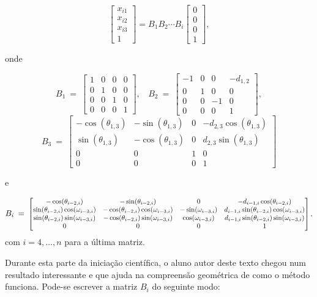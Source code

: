 \documentclass[
	12pt,				%
	openright,			%
	twoside,			%
	a4paper,			%
	english,			%
	french,				%
	spanish,			%
	brazil				%
	]{abntex2}
\newcommand\scalemath[2]{\scalebox{#1}{\mbox{\ensuremath{\displaystyle #2}}}}
\begin{document}
$$
\begin{bmatrix}
x_{i1}\\ 
x_{i2}\\ 
x_{i3}\\ 
1
\end{bmatrix}
= B_{1}B_{2}\cdots B_{i}\begin{bmatrix}
0\\ 
0\\ 
0\\ 
1
\end{bmatrix},
$$

onde

$$
B_1\: =\:
\begin{bmatrix}
1 & 0 & 0 & 0\\ 
0 & 1 & 0 & 0\\ 
0 & 0 & 1 & 0\\ 
0 & 0 & 0 & 1
\end{bmatrix},\:\:\:
\: B_2\: =\:
\begin{bmatrix}
-1 & 0 & 0 & -d_{1,2}\\
0 & 1 & 0 & 0\\ 
0 & 0 & -1 & 0\\ 
0 & 0 & 0 & 1
\end{bmatrix},
$$
$$
B_3\:=\:
\begin{bmatrix}
-\cos(\theta_{1,3}) & -\sin(\theta_{1,3}) & 0 & -d_{2,3}\cos(\theta_{1,3})\\ 
\sin(\theta_{1,3}) & -\cos(\theta_{1,3}) & 0 & d_{2,3}\sin(\theta_{1,3})\\ 
0 & 0 & 1 & 0\\ 
0 & 0 & 0 & 1
\end{bmatrix}
$$

e

$$
B_i\:=\:\scalemath{0.85}{
\begin{bmatrix}
-\cos(\theta_{i-2,i}) & -\sin(\theta_{i-2,i}) & 0 & -d_{i-1,i}\cos(\theta_{i-2,i})\\ 
\sin(\theta_{i-2,i})\cos(\omega_{i-3,i}) & -\cos(\theta_{i-2,i})\cos(\omega_{i-3,i})
 & -\sin(\omega_{i-3,i}) & d_{i-1,i}\sin(\theta_{i-2,i})\cos(\omega_{i-3,i})\\ 
\sin(\theta_{i-2,i})\sin(\omega_{i-3,i}) & -\cos(\theta_{i-2,i})\sin(\omega_{i-3,i}) & \cos(\omega_{i-3,i}) & d_{i-1,i}\sin(\theta_{i-2,i})\sin(\omega_{i-3,i})\\ 
0 & 0 & 0 & 1
\end{bmatrix},}
$$
com $i=4,\ldots,n$ para a última matriz.

Durante esta parte da iniciação científica, o aluno autor deste texto chegou num resultado interessante e que ajuda na compreensão geométrica de como o método funciona. Pode-se escrever a matriz $B_i$ do seguinte modo:
\end{document}
